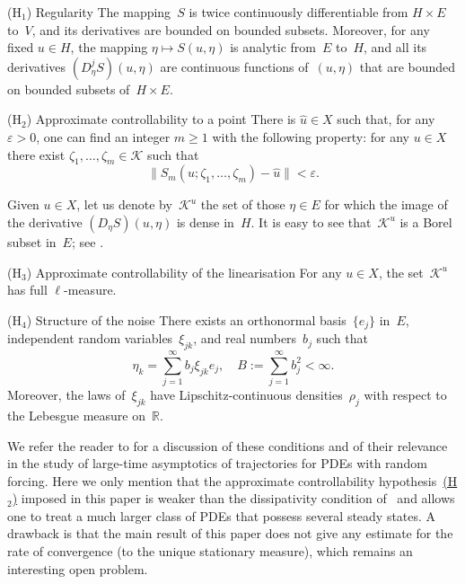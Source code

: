 \documentclass[JEP,XML,SOM,Unicode,ThmDefs]{cedram}
\let\mathcal\mathscr
\theoremstyle{plain}
\numberwithin{equation}{section}
\let\e\varepsilon
\newcommand{\R}{{\mathbb R}}
\newcommand{\KK}{{\mathcal K}}
\begin{document}
\begin{enonce*}{\hypertarget{H1}{(H$_1$)} Regularity}
The mapping~$S$ is twice continuously differentiable from $H\times E$ to~$V$, and its derivatives are bounded on bounded subsets. Moreover, for any fixed $u\in H$, the mapping $\eta\mapsto S(u,\eta)$ is analytic from~$E$ to~$H$, and all its derivatives $(D_\eta^jS)(u,\eta)$ are continuous functions of~$(u,\eta)$ that are bounded on bounded subsets of~$H\times E$.
\end{enonce*}

\begin{enonce*}{\hypertarget{H2}{(H$_2$)} Approximate controllability to a point}
There is $\hat u\in X$ such that, for any $\e>0$, one can find an integer $m\ge1$ with the following property: for any $u\in X$ there exist $\zeta_1,\dots,\zeta_m\in\KK$ such that
\begin{equation} \label{1.2}
\|S_m(u;\zeta_1,\dots,\zeta_m)-\hat u\|<\e.
\end{equation}
\end{enonce*}

Given $u\in X$, let us denote by~$\KK^u$ the set of those $\eta\in E$ for which the image of the derivative $(D_\eta S)(u,\eta)$ is dense in~$H$. It is easy to see that~$\KK^u$ is a Borel subset in~$E$; see \cite[\S1.1]{KNS-2020}.

\begin{enonce*}{\hypertarget{H3}{(H$_3$)} Approximate controllability of the linearisation}
For any $u\in X$, the set~$\KK^u$ has full $\ell$-measure.
\end{enonce*}

\begin{enonce*}{\hypertarget{H4}{(H$_4$)} Structure of the noise}
There exists an orthonormal basis~$\{e_j\}$ in~$E$, independent random variables~$\xi_{jk}$, and real numbers~$b_j$ such that
\begin{equation} \label{1.3}
\eta_k=\sum_{j=1}^\infty b_j\xi_{jk}e_j,\quad B:=\sum_{j=1}^\infty b_j^2<\infty.
\end{equation}
Moreover, the laws of~$\xi_{jk}$ have Lipschitz-continuous densities~$\rho_j$ with respect to the Lebesgue measure on~$\R$.
\end{enonce*}

We refer the reader to \cite[\S1.1]{KNS-2020} for a discussion of these conditions and of their relevance in the study of large-time asymptotics of trajectories for PDEs with random forcing. Here we only mention that the approximate controllability hypothesis~\hyperlink{H2}{(H$_2$)} imposed in this paper is weaker than the dissipativity condition of~\cite{KNS-2020} and allows one to treat a much larger class of PDEs that possess several steady states. A drawback is that the main result of this paper does not give any estimate for the rate of convergence (to the unique stationary measure), which remains an interesting open problem.
\end{document}
